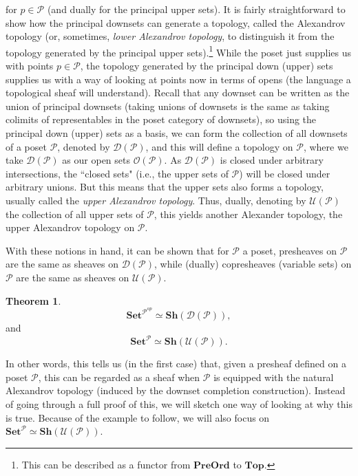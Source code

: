\documentclass[11pt]{book}
\theoremstyle{definition}
\theoremstyle{definition}
\theoremstyle{definition}
\newtheorem{theorem}{Theorem}[section]
\theoremstyle{theorem}
\theoremstyle{definition}
\begin{document}
for $p \in \mathcal{P}$ (and dually for the principal upper sets). It is fairly straightforward to show how the principal downsets can generate a topology, called the Alexandrov topology (or, sometimes, \textit{lower Alexandrov topology}, to distinguish it from the topology generated by the principal upper sets).\footnote{This can be described as a functor from $\textbf{PreOrd}$ to $\textbf{Top}$.} While the poset just supplies us with points $p \in \mathcal{P}$, the topology generated by the principal down (upper) sets supplies us with a way of looking at points now in terms of opens (the language a topological sheaf will understand).  Recall that any downset can be written as the union of principal downsets (taking unions of downsets is the same as taking colimits of representables in the poset category of downsets), so using the principal down (upper) sets as a basis, we can form the collection of all downsets of a poset $\mathcal{P}$, denoted by $\mathcal{D}(\mathcal{P})$, and this will define a topology on $\mathcal{P}$, where we take $\mathcal{D}(\mathcal{P})$ as our open sets $\mathscr{O}(\mathcal{P})$. As $\mathcal{D}(\mathcal{P})$ is closed under arbitrary intersections, the ``closed sets" (i.e., the upper sets of $\mathcal{P}$) will be closed under arbitrary unions. But this means that the upper sets also forms a topology, usually called the \textit{upper Alexandrov topology}. Thus, dually, denoting by $\mathcal{U}(\mathcal{P})$ the collection of all upper sets of $\mathcal{P}$, this yields another Alexander topology, the upper Alexandrov topology on $\mathcal{P}$. \par     
With these notions in hand, it can be shown that for $\mathcal{P}$ a poset, presheaves on $\mathcal{P}$ are the same as sheaves on $\mathcal{D}(\mathcal{P})$, while (dually) copresheaves (variable sets) on $\mathcal{P}$ are the same as sheaves on $\mathcal{U}(\mathcal{P})$. 
\begin{theorem}
	\begin{equation*}
	\textbf{Set}^{\mathcal{P}^{op}} \simeq \textbf{Sh}(\mathcal{D}(\mathcal{P})),
	\end{equation*}
	and 
	\begin{equation*}
	\textbf{Set}^{\mathcal{P}} \simeq \textbf{Sh}(\mathcal{U}(\mathcal{P})).
	\end{equation*}
\end{theorem} \noindent 
In other words, this tells us (in the first case) that, given a presheaf defined on a poset $\mathcal{P}$, this can be regarded as a sheaf when $\mathcal{P}$ is equipped with the natural Alexandrov topology (induced by the downset completion construction). Instead of going through a full proof of this, we will sketch one way of looking at why this is true. Because of the example to follow, we will also focus on $\textbf{Set}^{\mathcal{P}} \simeq \textbf{Sh}(\mathcal{U}(\mathcal{P}))$.\par 
\end{document}
